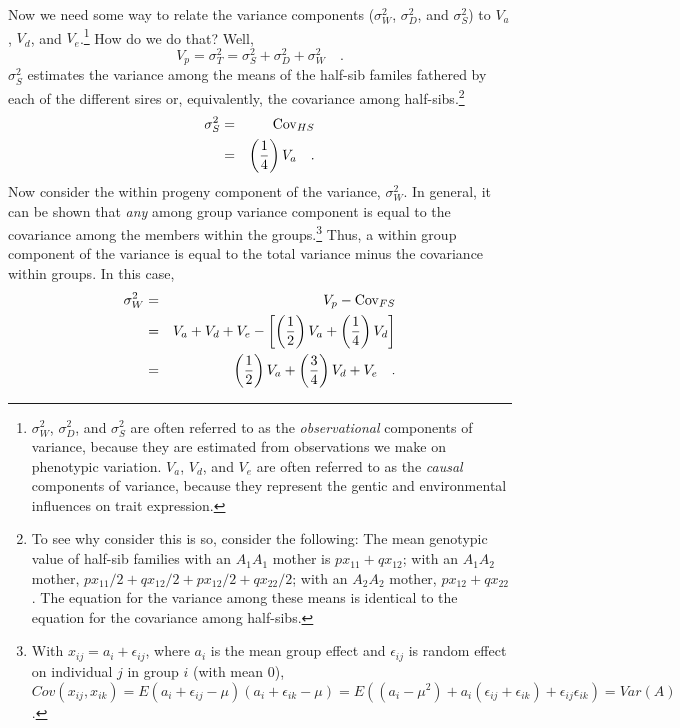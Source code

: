\documentclass[12pt]{article}
\begin{document}
Now we need some way to relate the variance components ($\sigma^2_W$,
$\sigma^2_D$, and $\sigma^2_S$) to $V_a$, $V_d$, and
$V_e$.\footnote{$\sigma^2_W$, $\sigma^2_D$, and $\sigma^2_S$ are often
  referred to as the {\it observational\/} components of variance,
  because they are estimated from observations we make on phenotypic
  variation. $V_a$, $V_d$, and $V_e$ are often referred to as the {\it
    causal\/} components of variance, because they represent the
  gentic and environmental influences on trait
  expression.} How do we
do that?  Well,
\[
V_p = \sigma^2_T = \sigma^2_S + \sigma^2_D + \sigma^2_W \quad .
\]
$\sigma^2_S$ estimates the variance among the means of the half-sib
familes fathered by each of the different sires or, equivalently, the
covariance among half-sibs.\footnote{To see why consider this is so,
  consider the following: The mean genotypic value of half-sib
  families with an $A_1A_1$ mother is $px_{11} + qx_{12}$; with an
  $A_1A_2$ mother, $px_{11}/2 + qx_{12}/2 + px_{12}/2 + qx_{22}/2$;
  with an $A_2A_2$ mother, $px_{12} + qx_{22}$.  The equation for the
  variance among these means is identical to the equation for the
  covariance among half-sibs.}
\begin{eqnarray*}
\sigma^2_S &=& \mbox{Cov}_{HS} \\
           &=& \left(\frac{1}{4}\right)V_a \quad .
\end{eqnarray*}
Now consider the within progeny component of the variance,
$\sigma^2_W$.  In general, it can be shown that {\it any\/} among
group variance component is equal to the covariance among the members
within the groups.\footnote{With $x_{ij} = a_i + \epsilon_{ij}$, where
  $a_i$ is the mean group effect and $\epsilon_{ij}$ is random effect
  on individual $j$ in group $i$ (with mean 0), $Cov(x_{ij},x_{ik}) =
  E(a_i + \epsilon_{ij} - \mu)(a_i + \epsilon_{ik} - \mu) = E((a_i
  -\mu^2) + a_i(\epsilon_{ij} + \epsilon_{ik}) +
  \epsilon_{ij}\epsilon_{ik}) = Var(A)$.}  Thus, a within group
component of the variance is equal to the total variance minus the
covariance within groups.  In this case,
\begin{eqnarray*}
\sigma^2_W &=& V_p - \mbox{Cov}_{FS} \\
 &=& V_a + V_d + V_e - \left[\left(\frac{1}{2}\right)V_a +
                            \left(\frac{1}{4}\right)V_d
                      \right] \\
 &=& \left(\frac{1}{2}\right)V_a
    + \left({3 \over 4}\right)V_d
    + V_e \quad .
\end{eqnarray*}
\end{document}
